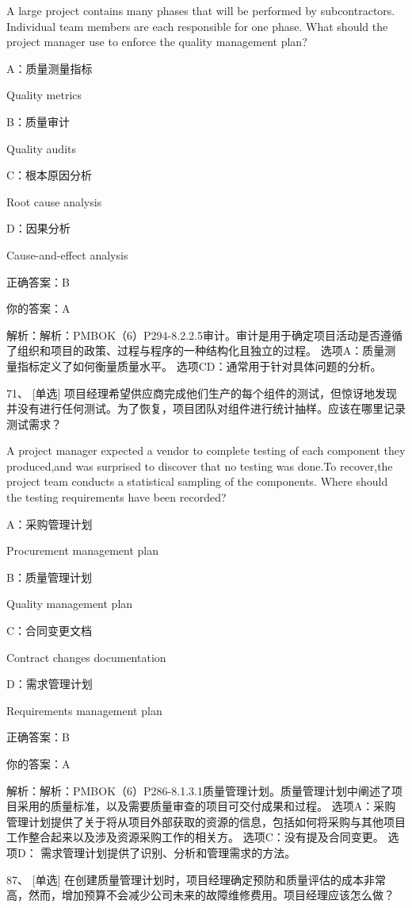 A large project contains many phases that will be performed by subcontractors. Individual team members are each responsible for one phase. What should the project manager use to enforce the quality management plan?

A：质量测量指标

Quality metrics

B：质量审计

Quality audits

C：根本原因分析

Root cause analysis

D：因果分析

Cause-and-effect analysis

正确答案：B

你的答案：A

解析：解析：PMBOK（6）P294-8.2.2.5审计。审计是用于确定项目活动是否遵循了组织和项目的政策、过程与程序的一种结构化且独立的过程。 选项A：质量测量指标定义了如何衡量质量水平。 选项CD：通常用于针对具体问题的分析。


71、 [单选] 项目经理希望供应商完成他们生产的每个组件的测试，但惊讶地发现并没有进行任何测试。为了恢复，项目团队对组件进行统计抽样。应该在哪里记录测试需求？

A project manager expected a vendor to complete testing of each component they produced,and was surprised to discover that no testing was done.To recover,the project team conducts a statistical sampling of the components. Where should the testing requirements have been recorded?

A：采购管理计划

Procurement management plan

B：质量管理计划

Quality management plan

C：合同变更文档

Contract changes documentation

D：需求管理计划

Requirements management plan

正确答案：B

你的答案：A

解析：解析：PMBOK（6）P286-8.1.3.1质量管理计划。质量管理计划中阐述了项目采用的质量标准，以及需要质量审查的项目可交付成果和过程。 选项A：采购管理计划提供了关于将从项目外部获取的资源的信息，包括如何将采购与其他项目工作整合起来以及涉及资源采购工作的相关方。 选项C：没有提及合同变更。 选项D： 需求管理计划提供了识别、分析和管理需求的方法。


87、 [单选] 在创建质量管理计划时，项目经理确定预防和质量评估的成本非常高，然而，增加预算不会减少公司未来的故障维修费用。项目经理应该怎么做？

